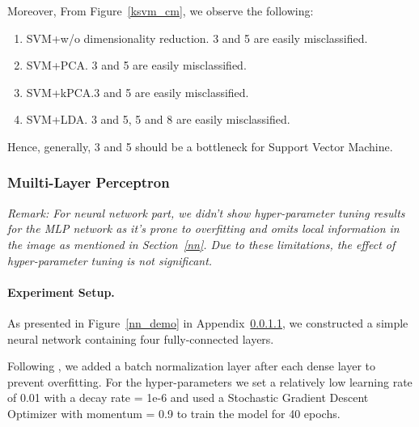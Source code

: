 \documentclass{article}
\begin{document}
Moreover, From Figure~\ref{ksvm_cm}, we observe the following:
\begin{enumerate}
    \item SVM+w/o dimensionality reduction. 3 and 5 are easily misclassified.
    \item SVM+PCA. 3 and 5 are easily misclassified.
    \item SVM+kPCA.3 and 5 are easily misclassified.
    \item SVM+LDA. 3 and 5, 5 and 8 are easily misclassified.
\end{enumerate}

Hence, generally, 3 and 5 should be a bottleneck for Support Vector Machine. 
\subsubsection{Muilti-Layer Perceptron}
\emph{Remark: For neural network part, we didn't show hyper-parameter tuning results for the MLP network as it's prone to overfitting and omits local information in the image as mentioned in Section~\ref{nn}. Due to these limitations, the effect of hyper-parameter tuning is not significant.} 
\paragraph{Experiment Setup. } As presented in Figure~\ref{nn_demo} in Appendix~\ref{}, we constructed a simple neural network containing four fully-connected layers.  

Following \cite{ensemble}, we added a batch normalization layer after each dense layer to prevent overfitting. For the hyper-parameters we set a relatively low learning rate of 0.01 with a decay rate = 1e-6 and used a Stochastic Gradient Descent Optimizer with momentum = 0.9 to train the model for 40 epochs. 
\end{document}
